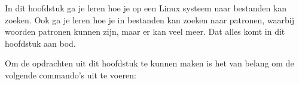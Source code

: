In dit hoofdstuk ga je leren hoe je op een Linux systeem naar bestanden kan zoeken. Ook ga je leren hoe je in bestanden kan zoeken naar patronen, waarbij woorden patronen kunnen zijn, maar er kan veel meer. Dat alles komt in dit hoofdstuk aan bod.

Om de opdrachten uit dit hoofdstuk te kunnen maken is het van belang om de volgende commando's uit te voeren:

